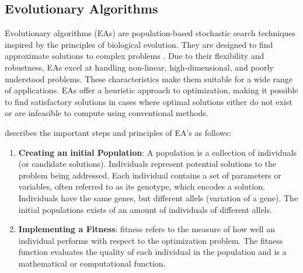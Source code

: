 \begin{onehalfspace}
\subsection{Evolutionary Algorithms}
Evolutionary algorithms (EAs) are population-based stochastic search techniques inspired by 
the principles of biological evolution. They are designed to find approximate solutions to 
complex problems
\citep{bartz2014evolutionary}. Due to their flexibility and robustness, EAs excel at handling 
non-linear, high-dimensional, and poorly understood problems. These characteristics make them 
suitable for a wide range of applications. EAs offer a heuristic approach to optimization, making 
it possible to find satisfactory solutions in cases where optimal solutions either do not exist or 
are infeasible to compute using conventional methods. \citep{bartz2014evolutionary,michalewicz2013solve}

\citet{michalewicz2013solve} describes the important steps and principles of EA's as follows:


\begin{enumerate}
  \item \textbf{Creating an initial Population}: A population is a collection of individuals (or candidate solutions).
    Individuals represent potential solutions to the problem being addressed. Each individual contains a set of parameters or variables, 
    often referred to as its genotype, which encodes a solution. Individuals have the same genes, but different allels (variation of a gene).
    The initial populations exists of an amount of individuals of different allels.

  \item \textbf{Implementing a Fitness}: fitness refers to the measure of how well an individual 
   performs with respect to the optimization problem. The fitness function evaluates the quality of each individual in the population
   and is a mathematical or computational function.


\end{enumerate}
\end{onehalfspace}

